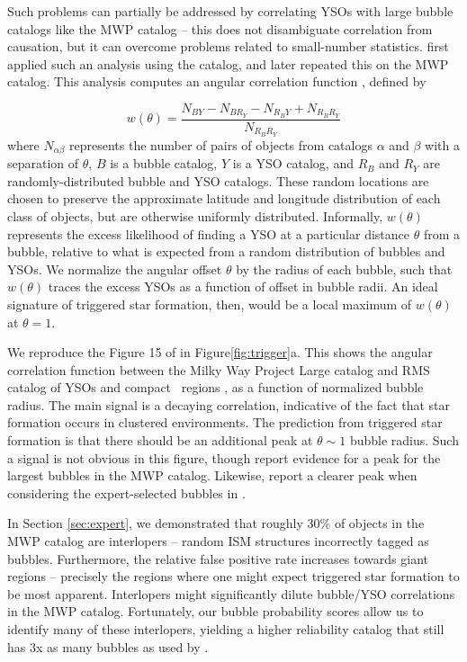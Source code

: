 Such problems can partially be addressed by correlating YSOs with large bubble catalogs like the MWP catalog -- this does not disambiguate correlation from causation, but it can overcome problems related to small-number statistics. \cite{Thompson12} first applied such an analysis using the \cite{Churchwell06} catalog, and \cite{Kendrew12} later repeated this on the MWP catalog. This analysis computes an angular correlation function \citep{Landy93, Bradshaw11}, defined by

\begin{equation}
w(\theta) = \frac{N_{BY} - N_{BR_Y} - N_{R_BY} + N_{R_BR_Y}}{N_{R_BR_Y}}
\label{eq:corr}
\end{equation}
where $N_{\alpha \beta}$ represents the number of pairs of objects from catalogs $\alpha$ and $\beta$ with a separation of $\theta$, $B$ is a bubble catalog, $Y$ is a YSO catalog, and $R_B$ and $R_Y$ are randomly-distributed bubble and YSO catalogs. These random locations are chosen to preserve the approximate latitude and longitude distribution of each class of objects, but are otherwise uniformly distributed. Informally, $w(\theta)$ represents the excess likelihood of finding a YSO at a particular distance $\theta$ from a bubble, relative to what is expected from a random distribution of bubbles and YSOs. We normalize the angular offset $\theta$ by the radius of each bubble, such that $w(\theta)$ traces the excess YSOs as a function of offset in bubble radii. An ideal signature of triggered star formation, then, would be a local maximum of $w(\theta)$ at $\theta = 1$.

We reproduce the Figure 15 of \cite{Kendrew12} in Figure\ref{fig:trigger}a. This shows the angular correlation function between the Milky Way Project Large catalog and RMS catalog of YSOs and compact \hii\, regions \citep{RMS}, as a function of normalized bubble radius. The main signal is a decaying correlation, indicative of the fact that star formation occurs in clustered environments. The prediction from triggered star formation is that there should be an additional peak at $\theta \sim 1$ bubble radius. Such a signal is not obvious in this figure, though \cite{Kendrew12} report evidence for a peak for the largest bubbles in the MWP catalog. Likewise, \cite{Thompson12} report a clearer peak when considering the expert-selected bubbles in \cite{Churchwell06}.

In Section \ref{sec:expert}, we demonstrated that roughly 30\% of objects in the MWP catalog are interlopers -- random ISM structures incorrectly tagged as bubbles. Furthermore, the relative false positive rate increases towards giant \hii\, regions -- precisely the regions where one might expect triggered star formation to be most apparent. Interlopers might significantly dilute bubble/YSO correlations in the MWP catalog. Fortunately, our bubble probability scores allow us to identify many of these interlopers, yielding a higher reliability catalog that still has 3x as many bubbles as used by \cite{Thompson12}.

